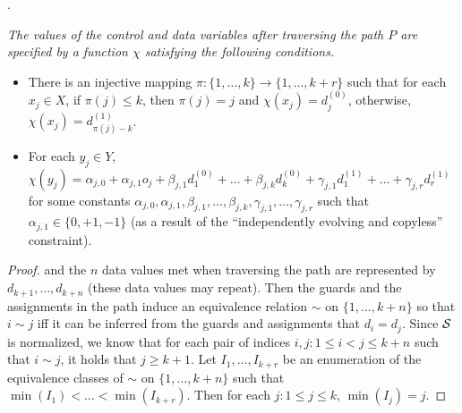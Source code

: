 \begin{appendix}
.
{\it The values of the control and data variables after traversing the path $P$ are specified by a function $\chi$ satisfying the following conditions.
\begin{itemize}
\item There is an injective mapping $\pi: \{1,\dots,k\} \rightarrow \{1,\dots, k+r\}$ such that for each $x_j \in X$, if $\pi(j) \le k$, then $\pi(j)=j$ and $\chi(x_j)=d^{(0)}_{j}$, otherwise, $\chi(x_j)=d^{(1)}_{\pi(j)-k}$.
% 
\item For each $y_j \in Y$, $\chi(y_j) = \alpha_{j,0} + \alpha_{j,1} o_j + \beta_{j,1} d^{(0)}_1 + \dots + \beta_{j,k} d^{(0)}_k + \gamma_{j,1} d^{(1)}_1 +\dots + \gamma_{j,r} d^{(1)}_{r}$ for some constants $\alpha_{j,0},\alpha_{j,1}, \beta_{j,1},\dots,\beta_{j,k}, \gamma_{j,1},\dots,\gamma_{j,r}$ such that $\alpha_{j,1} \in \{0,+1,-1\}$ (as a result of the ``independently evolving and copyless'' constraint).
\end{itemize}
}

\begin{proof}
and the $n$ data values met when traversing the path are represented by $d_{k+1},\dots,d_{k+n}$ (these data values may repeat). Then the guards and the assignments in the path induce an equivalence relation $\sim$ on $\{1,\dots, k+n\}$ so that  $i \sim j$ iff it can be inferred from the guards and assignments that $d_i = d_j$. Since ${\mathcal{S} }$ is normalized, we know that for each pair of indices $i,j: 1 \le i < j \le k+n$ such that $i \sim j$, it holds that $j \ge k+1$. Let $I_1,\dots, I_{k+r}$ be an enumeration of the equivalence classes of $\sim$ on $\{1,\dots, k+n\}$ such that $\min(I_1) < \dots < \min(I_{k+r})$. Then for each $j: 1 \le j \le k$, $\min(I_j)=j$.




\end{proof}
\end{appendix}
